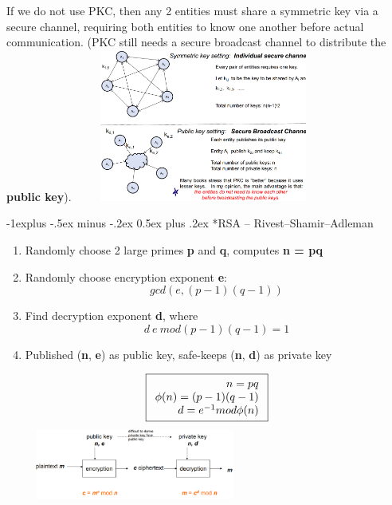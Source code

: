\documentclass[10pt,landscape]{article}
\makeatletter
\renewcommand{\subsection}{\@startsection{subsection}{2}{0mm}%
                                {-1explus -.5ex minus -.2ex}%
                                {0.5ex plus .2ex}%
                                {\normalfont\normalsize\bfseries}}
\makeatother
\begin{document}
\begin{multicols*}{3}
If we do not use PKC, then any 2 entities must share a symmetric key via a secure channel, requiring both entities to know one another before actual communication.
(PKC still needs a secure broadcast channel to distribute the \textbf{public key}).
\includegraphics*[height=5cm, width=8.5cm]{images/keydistribution.png}

\subsection*{RSA -- Rivest–Shamir–Adleman}
\begin{enumerate}[noitemsep,wide=0pt, leftmargin=\dimexpr\labelwidth + 2\labelsep\relax]
    \item Randomly choose 2 large primes \textbf{p} and \textbf{q}, computes \textbf{n = pq}
    \item Randomly choose encryption exponent \textbf{e}: 
    \noindent\begin{equation*}
        gcd(e, (p-1)(q-1))
    \end{equation*}
    \item Find decryption exponent \textbf{d}, where 
    \noindent\begin{equation*}
        d \ e  \ mod(p-1)(q-1) = 1
    \end{equation*}
    \item Published (\textbf{n}, \textbf{e}) as public key, safe-keeps (\textbf{n}, \textbf{d}) as private key
\end{enumerate}
\begin{equation*}
    \noindent\boxed{
    \begin{array}{rcl}
        n = pq \\
        \phi(n) = (p-1)(q-1) \\
        d = e^{-1} mod \phi(n)
    \end{array}
    }
\end{equation*}
\includegraphics*[height=2.3cm, width=8.5cm]{images/RSA.png}


\end{multicols*}
\end{document}
